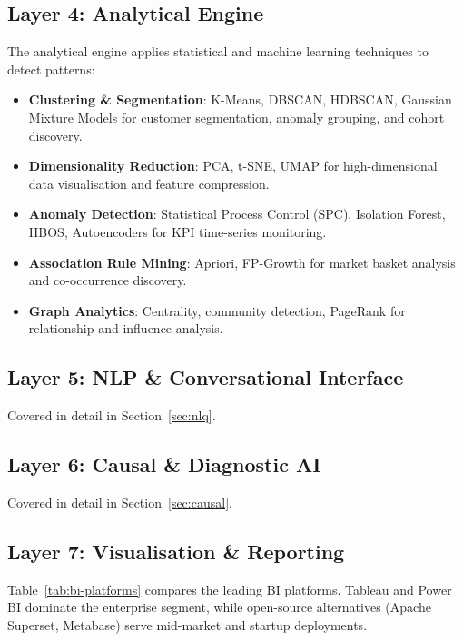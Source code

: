 \documentclass[12pt, a4paper]{article}
\begin{document}
\subsection{Layer 4: Analytical Engine}
The analytical engine applies statistical and machine learning techniques to detect patterns:

\begin{itemize}
    \item \textbf{Clustering \& Segmentation}: K-Means, DBSCAN, HDBSCAN, Gaussian Mixture Models for customer segmentation, anomaly grouping, and cohort discovery.
    \item \textbf{Dimensionality Reduction}: PCA, t-SNE, UMAP for high-dimensional data visualisation and feature compression.
    \item \textbf{Anomaly Detection}: Statistical Process Control (SPC), Isolation Forest, HBOS, Autoencoders for KPI time-series monitoring.
    \item \textbf{Association Rule Mining}: Apriori, FP-Growth for market basket analysis and co-occurrence discovery.
    \item \textbf{Graph Analytics}: Centrality, community detection, PageRank for relationship and influence analysis.
\end{itemize}

\subsection{Layer 5: NLP \& Conversational Interface}
Covered in detail in Section~\ref{sec:nlq}.

\subsection{Layer 6: Causal \& Diagnostic AI}
Covered in detail in Section~\ref{sec:causal}.

\subsection{Layer 7: Visualisation \& Reporting}
Table~\ref{tab:bi-platforms} compares the leading BI platforms. Tableau and Power BI dominate the enterprise segment, while open-source alternatives (Apache Superset, Metabase) serve mid-market and startup deployments.
\end{document}
